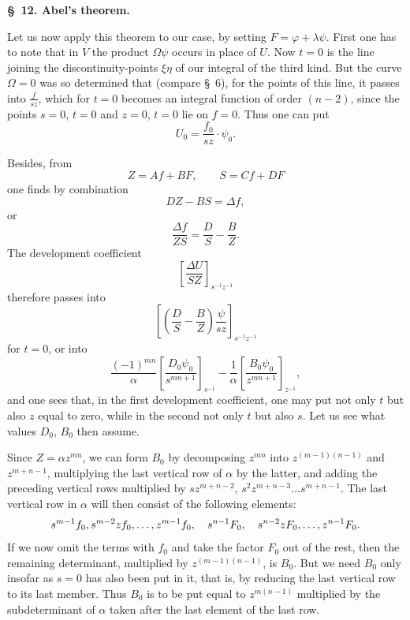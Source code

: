 \documentclass[10pt]{article}
\begin{document}
\begin{center}
{\bfseries \S\ 12. Abel's theorem.}
\end{center}

Let us now apply this theorem to our case, by setting $F=\varphi+\lambda\psi$. First one has to note that in $V$ the product $\Omega\psi$ occurs in place of $U$. Now $t=0$ is the line joining the discontinuity-points $\xi\eta$ of our integral of the third kind. But the curve $\Omega=0$ was so determined that (compare \S\ 6), for the points of this line, it passes into $\frac{f}{sz}$, which for $t=0$ becomes an integral function of order $(n-2)$, since the points $s=0$, $t=0$ and $z=0$, $t=0$ lie on $f=0$. Thus one can put
\[
U_0=\frac{f_0}{sz}\cdot\psi_0.
\]

Besides, from
\[
Z=Af+BF,
\qquad
S=Cf+DF
\]
one finds by combination
\[
DZ-BS=\Delta f,
\]
or
\[
\frac{\Delta f}{ZS}=\frac{D}{S}-\frac{B}{Z}.
\]
The development coefficient
\[
\left[\frac{\Delta U}{SZ}\right]_{s^{-1}z^{-1}}
\]
therefore passes into
\[
\left[\left(\frac{D}{S}-\frac{B}{Z}\right)\frac{\psi}{sz}\right]_{s^{-1}z^{-1}}
\]
for $t=0$, or into
\[
\frac{(-1)^{mn}}{\alpha}\left[\frac{D_0\psi_0}{s^{mn+1}}\right]_{s^{-1}}
-\frac{1}{\alpha}\left[\frac{B_0\psi_0}{z^{mn+1}}\right]_{z^{-1}},
\]
and one sees that, in the first development coefficient, one may put not only $t$ but also $z$ equal to zero, while in the second not only $t$ but also $s$. Let us see what values $D_0$, $B_0$ then assume.

Since $Z=\alpha z^{mn}$, we can form $B_0$ by decomposing $z^{mn}$ into $z^{(m-1)(n-1)}$ and $z^{m+n-1}$, multiplying the last vertical row of $\alpha$ by the latter, and adding the preceding vertical rows multiplied by $sz^{m+n-2}$, $s^2z^{m+n-3}\ldots s^{m+n-1}$. The last vertical row in $\alpha$ will then consist of the following elements:
\[
s^{m-1}f_0,\\ s^{m-2}zf_0,\ldots,z^{m-1}f_0,
\quad s^{n-1}F_0,
\quad s^{n-2}zF_0,\ldots,z^{n-1}F_0.
\]
If we now omit the terms with $f_0$ and take the factor $F_0$ out of the rest, then the remaining determinant, multiplied by $z^{(m-1)(n-1)}$, is $B_0$. But we need $B_0$ only insofar as $s=0$ has also been put in it, that is, by reducing the last vertical row to its last member. Thus $B_0$ is to be put equal to $z^{m(n-1)}$ multiplied by the subdeterminant of $\alpha$ taken after the last element of the last row.
\end{document}
